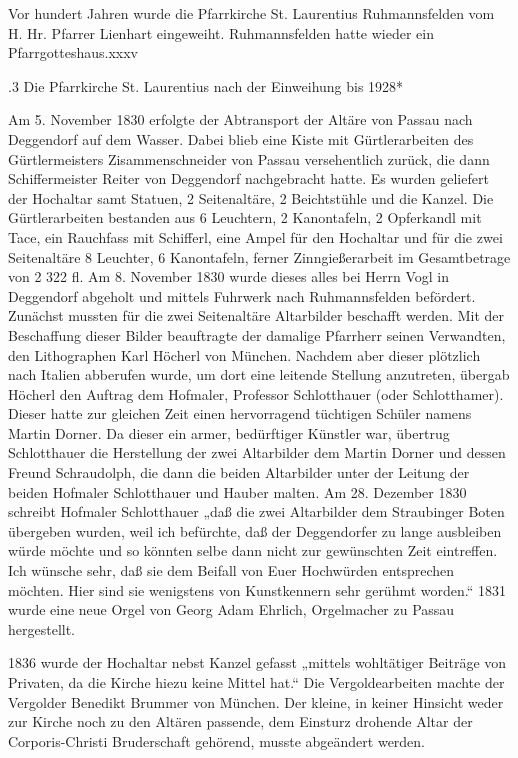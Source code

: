 \documentclass[12pt,a4paper]{book}
\begin{document}
Vor hundert Jahren wurde die Pfarrkirche St. Laurentius Ruhmannsfelden vom H.
Hr. Pfarrer Lienhart eingeweiht. Ruhmannsfelden hatte wieder ein
Pfarrgotteshaus.xxxv

.3 Die Pfarrkirche St. Laurentius nach der Einweihung bis 1928*

Am 5. November 1830 erfolgte der Abtransport der Altäre von Passau nach
Deggendorf auf dem Wasser. Dabei blieb eine Kiste mit Gürtlerarbeiten des
Gürtlermeisters Zisammenschneider von Passau versehentlich zurück, die dann
Schiffermeister Reiter von Deggendorf nachgebracht hatte. Es wurden geliefert
der Hochaltar samt Statuen, 2 Seitenaltäre, 2 Beichtstühle und die Kanzel. Die
Gürtlerarbeiten bestanden aus 6 Leuchtern, 2 Kanontafeln, 2 Opferkandl mit Tace,
ein Rauchfass mit Schifferl, eine Ampel für den Hochaltar und für die zwei
Seitenaltäre 8 Leuchter, 6 Kanontafeln, ferner Zinngießerarbeit im Gesamtbetrage
von 2 322 fl. Am 8. November 1830 wurde dieses alles bei Herrn Vogl in
Deggendorf abgeholt und mittels Fuhrwerk nach Ruhmannsfelden befördert. Zunächst
mussten für die zwei Seitenaltäre Altarbilder beschafft werden. Mit der
Beschaffung dieser Bilder beauftragte der damalige Pfarrherr seinen Verwandten,
den Lithographen Karl Höcherl von München. Nachdem aber dieser plötzlich nach
Italien abberufen wurde, um dort eine leitende Stellung anzutreten, übergab
Höcherl den Auftrag dem Hofmaler, Professor Schlotthauer (oder Schlotthamer).
Dieser hatte zur gleichen Zeit einen hervorragend tüchtigen Schüler namens
Martin Dorner. Da dieser ein armer, bedürftiger Künstler war, übertrug
Schlotthauer die Herstellung der zwei Altarbilder dem Martin Dorner und dessen
Freund Schraudolph, die dann die beiden Altarbilder unter der Leitung der beiden
Hofmaler Schlotthauer und Hauber malten. Am 28. Dezember 1830 schreibt Hofmaler
Schlotthauer „daß die zwei Altarbilder dem Straubinger Boten übergeben wurden,
weil ich befürchte, daß der Deggendorfer zu lange ausbleiben würde möchte und so
könnten selbe dann nicht zur gewünschten Zeit eintreffen. Ich wünsche sehr, daß
sie dem Beifall von Euer Hochwürden entsprechen möchten. Hier sind sie
wenigstens von Kunstkennern sehr gerühmt worden.“ 1831 wurde eine neue Orgel von
Georg Adam Ehrlich, Orgelmacher zu Passau hergestellt.

1836 wurde der Hochaltar nebst Kanzel gefasst „mittels wohltätiger Beiträge von
Privaten, da die Kirche hiezu keine Mittel hat.“ Die Vergoldearbeiten machte der
Vergolder Benedikt Brummer von München. Der kleine, in keiner Hinsicht weder zur
Kirche noch zu den Altären passende, dem Einsturz drohende Altar der
Corporis-Christi Bruderschaft gehörend, musste abgeändert werden.
\end{document}
